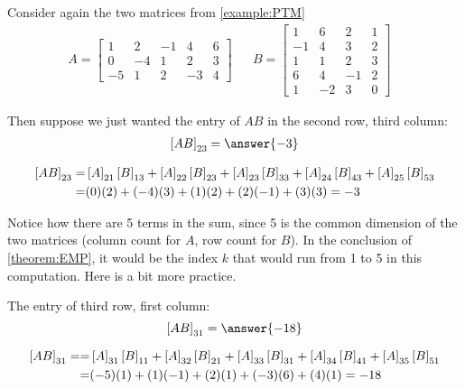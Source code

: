 \documentclass{ximera}
\begin{document}
\begin{example}
  
  Consider again the two matrices from \ref{example:PTM}
  \begin{align*}
    A=
    \begin{bmatrix}
      1 & 2 & -1 & 4 & 6\\
      0 & -4 & 1 & 2 & 3\\
      -5 & 1 & 2 & -3 & 4
    \end{bmatrix}
        &&
           B=
           \begin{bmatrix}
             1 & 6 & 2 & 1\\
             -1 & 4 & 3 & 2\\
             1 & 1 & 2 & 3\\
             6 & 4 & -1 & 2\\
             1 & -2 & 3 & 0
           \end{bmatrix} &
  \end{align*}
  
  Then suppose we just wanted the entry of $AB$ in the second row, third column:
  \begin{align*}
    \matrixentry{AB}{23} = \answer{-3}
  \end{align*}
  \begin{hint}
    \begin{align*}
      \left\lbrack AB\right\rbrack_{23} =&
                              \left\lbrack A\right\rbrack_{21}\left\lbrack B\right\rbrack_{13}+
                              \left\lbrack A\right\rbrack_{22}\left\lbrack B\right\rbrack_{23}+
                              \left\lbrack A\right\rbrack_{23}\left\lbrack B\right\rbrack_{33}+
                              \left\lbrack A\right\rbrack_{24}\left\lbrack B\right\rbrack_{43}+
                              \left\lbrack A\right\rbrack_{25}\left\lbrack B\right\rbrack_{53}\\
      =&(0)(2)+(-4)(3)+(1)(2)+(2)(-1)+(3)(3)=-3
    \end{align*}
  \end{hint}
  
  Notice how there are 5 terms in the sum, since 5 is the common
  dimension of the two matrices (column count for $A$, row count for
  $B$).  In the conclusion of \ref{theorem:EMP}, it would be the index
  $k$ that would run from 1 to 5 in this computation.  Here is a bit
  more practice.

  The entry of third row, first column:
  \[
    \matrixentry{AB}{31} = \answer{-18}
  \]
  
  \begin{hint}
    \begin{align*}
      \left\lbrack AB\right\rbrack_{31} = 
      =&
         \left\lbrack A\right\rbrack_{31}\left\lbrack B\right\rbrack_{11}+
         \left\lbrack A\right\rbrack_{32}\left\lbrack B\right\rbrack_{21}+
         \left\lbrack A\right\rbrack_{33}\left\lbrack B\right\rbrack_{31}+
         \left\lbrack A\right\rbrack_{34}\left\lbrack B\right\rbrack_{41}+
         \left\lbrack A\right\rbrack_{35}\left\lbrack B\right\rbrack_{51}\\
      =&(-5)(1)+(1)(-1)+(2)(1)+(-3)(6)+(4)(1)=-18
    \end{align*}
  \end{hint}


\end{example}
\end{document}
